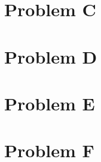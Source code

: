 \documentclass[a4paper]{article}
\begin{document}
\section*{Problem C}


\section*{Problem D}


\section*{Problem E}


\section*{Problem F}
\end{document}
